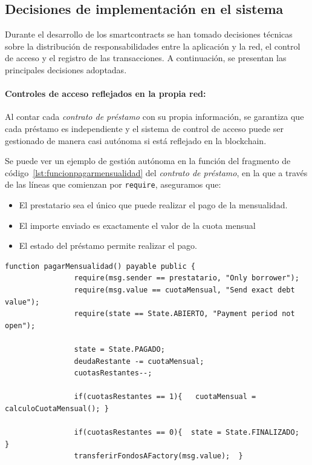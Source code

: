 \subsection{Decisiones de implementación en el sistema}

Durante el desarrollo de los \glspl{smartcontract} se han tomado decisiones
técnicas sobre la distribución de responsabilidades entre la aplicación y la red,
el control de acceso y el registro de las transacciones. A continuación, se
presentan las principales decisiones adoptadas.

\paragraph{Controles de acceso reflejados en la propia red:}
Al contar cada \textit{contrato de préstamo} con su propia información,
se garantiza que 
cada préstamo es independiente y el sistema de control de acceso puede 
ser gestionado de manera casi autónoma si está reflejado en la \gls{blockchain}. 

Se puede ver un ejemplo de gestión autónoma en la función del fragmento de código~\ref{lst:funcionpagarmensualidad}
 del 
\textit{contrato de préstamo}, en la que a través de las líneas que comienzan por
\lstinline[language=Solidity]|require|, aseguramos que:
\begin{itemize}
    \item El 
prestatario sea el único que puede realizar el pago de la mensualidad.
\item El importe enviado es exactamente el valor de la cuota mensual
\item El estado del préstamo permite realizar el pago.
\end{itemize} 

        \begin{lstlisting}[language=Solidity, caption={Función para pagar mensualidad},label={lst:funcionpagarmensualidad}]
            function pagarMensualidad() payable public {
                require(msg.sender == prestatario, "Only borrower");
                require(msg.value == cuotaMensual, "Send exact debt value");
                require(state == State.ABIERTO, "Payment period not open");
            
                state = State.PAGADO;
                deudaRestante -= cuotaMensual;
                cuotasRestantes--;

                if(cuotasRestantes == 1){   cuotaMensual = calculoCuotaMensual(); }

                if(cuotasRestantes == 0){  state = State.FINALIZADO;  }
                transferirFondosAFactory(msg.value);  }
        \end{lstlisting}



